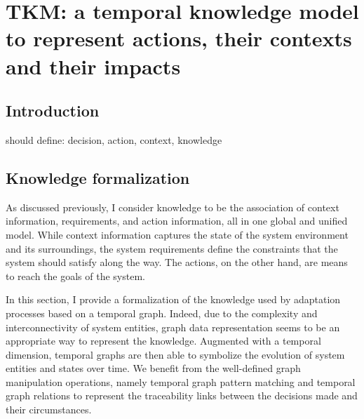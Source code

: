 \chapter[TKM: a temporal knowledge model]{TKM: a temporal knowledge model to represent actions, their contexts and their impacts}
 
 \section{Introduction}
 
should define: decision, action, context, knowledge

\section{Knowledge formalization}
 
  As discussed previously, I consider \gls{knowledge} to be the association of \gls{context} information, \glspl{requirement}, and \gls{action} information, all in one global and unified model.
 While \gls{context} information captures the state of the system environment and its surroundings, the system \glspl{requirement} define the constraints that the system should satisfy along the way. 
 The \glspl{action}, on the other hand, are means to reach the goals of the system.
  
 In this section, I provide a formalization of the \gls{knowledge} used by adaptation processes based on a temporal graph. 
Indeed, due to the complexity and interconnectivity of system entities, graph data representation seems to be an appropriate way to represent the \gls{knowledge}. 
Augmented with a temporal dimension, temporal graphs are then able to symbolize the evolution of system entities and states over time. 
We benefit from the well-defined graph manipulation operations, namely temporal graph pattern matching and temporal graph relations to represent the traceability links between the \glspl{decision} made and their \glspl{circumstance}.

